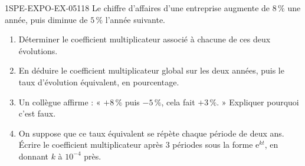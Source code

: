 \begin{exercice}{1SPE-EXPO-EX-051}{1}{8}
Le chiffre d'affaires d'une entreprise augmente de $8\,\%$ une année, puis
diminue de $5\,\%$ l'année suivante.
\begin{enumerate}
\item Déterminer le coefficient multiplicateur associé à chacune de ces deux
  évolutions.
\item En déduire le coefficient multiplicateur global sur les deux années, puis
  le taux d'évolution équivalent, en pourcentage.
\item Un collègue affirme : « $+8\,\%$ puis $-5\,\%$, cela fait $+3\,\%$. »
  Expliquer pourquoi c'est faux.
\item On suppose que ce taux équivalent se répète chaque période de deux ans.
  Écrire le coefficient multiplicateur après $3$ périodes sous la forme
  $\mathrm{e}^{kt}$, en donnant $k$ à $10^{-4}$ près.
\end{enumerate}
\end{exercice}
